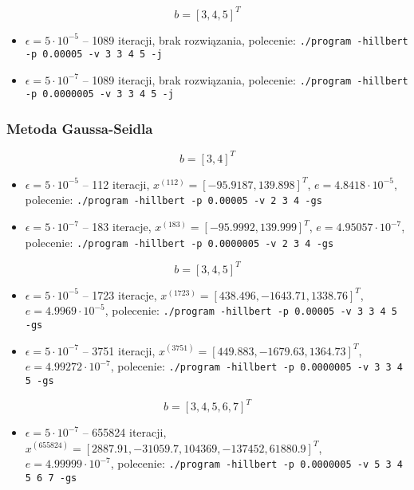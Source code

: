 \documentclass[a4paper,11pt]{article}
\begin{document}
    $$ b = [3, 4, 5]^T $$
    \begin{itemize}
      \item $ \epsilon = 5 \cdot 10^{-5} $ -- 1089 iteracji, brak rozwiązania,
            polecenie: \texttt{./program -hillbert -p 0.00005 -v 3 3 4 5 -j}
      \item $ \epsilon = 5 \cdot 10^{-7} $ -- 1089 iteracji, brak rozwiązania,
            polecenie: \texttt{./program -hillbert -p 0.0000005 -v 3 3 4 5 -j}
    \end{itemize}
    
    \subsubsection{Metoda Gaussa-Seidla}
      $$ b = [3, 4]^T $$
    \begin{itemize}
      \item $ \epsilon = 5 \cdot 10^{-5} $ -- 112 iteracji, $ x^{(112)} = [-95.9187, 139.898]^T $, $ e = 4.8418 \cdot 10^{-5} $,
            polecenie: \texttt{./program -hillbert -p 0.00005 -v 2 3 4 -gs}
      \item $ \epsilon = 5 \cdot 10^{-7} $ -- 183 iteracje, $ x^{(183)} = [-95.9992, 139.999]^T $, $ e = 4.95057 \cdot 10^{-7} $,
            polecenie: \texttt{./program -hillbert -p 0.0000005 -v 2 3 4 -gs}
    \end{itemize}
    
    $$ b = [3, 4, 5]^T $$
    \begin{itemize}
      \item $ \epsilon = 5 \cdot 10^{-5} $ -- 1723 iteracje, $ x^{(1723)} = [438.496, -1643.71, 1338.76]^T $, $ e = 4.9969 \cdot 10^{-5} $,
            polecenie: \texttt{./program -hillbert -p 0.00005 -v 3 3 4 5 -gs}
      \item $ \epsilon = 5 \cdot 10^{-7} $ -- 3751 iteracji, $ x^{(3751)} = [449.883, -1679.63, 1364.73]^T $, $ e = 4.99272 \cdot 10^{-7} $,
            polecenie: \texttt{./program -hillbert -p 0.0000005 -v 3 3 4 5 -gs}
    \end{itemize}
    
     $$ b = [3, 4, 5, 6, 7]^T $$
    \begin{itemize}
      \item $ \epsilon = 5 \cdot 10^{-7} $ -- 655824 iteracji, $ x^{(655824)} = [2887.91, -31059.7, 104369, -137452, 61880.9]^T $, $ e = 4.99999 \cdot 10^{-7} $,
            polecenie: \texttt{./program -hillbert -p 0.0000005 -v 5 3 4 5 6 7 -gs}
    \end{itemize}
    
\end{document}
